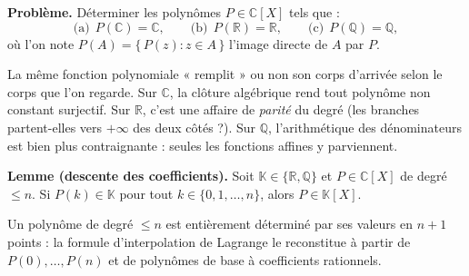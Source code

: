 


\begin{tcolorbox}[thmbox]
  \textbf{Problème.}\enspace%
  Déterminer les polynômes $P \in \mathbb{C}[X]$ tels que :
  \[
    \text{(a)}\ \ P(\mathbb{C}) = \mathbb{C}, \qquad
    \text{(b)}\ \ P(\mathbb{R}) = \mathbb{R}, \qquad
    \text{(c)}\ \ P(\mathbb{Q}) = \mathbb{Q},
  \]
  où l'on note $P(A) = \{\,P(z) : z \in A\,\}$ l'image directe de $A$ par $P$.
\end{tcolorbox}

\begin{significationintuitive}
La même fonction polynomiale « remplit » ou non son corps d'arrivée selon le
corps que l'on regarde. Sur $\mathbb{C}$, la clôture algébrique rend tout
polynôme non constant surjectif. Sur $\mathbb{R}$, c'est une affaire de
\emph{parité} du degré (les branches partent-elles vers $+\infty$ des deux
côtés ?). Sur $\mathbb{Q}$, l'arithmétique des dénominateurs est bien plus
contraignante : seules les fonctions affines y parviennent.
\end{significationintuitive}

\decsep{}


\begin{tcolorbox}[thmbox]
  \textbf{Lemme (descente des coefficients).}\enspace%
  Soit $\mathbb{K} \in \{\mathbb{R}, \mathbb{Q}\}$ et $P \in \mathbb{C}[X]$ de
  degré $\leq n$. Si $P(k) \in \mathbb{K}$ pour tout $k \in \{0,1,\ldots,n\}$,
  alors $P \in \mathbb{K}[X]$.
\end{tcolorbox}

\begin{ideepreuve}
Un polynôme de degré $\leq n$ est entièrement déterminé par ses valeurs en
$n+1$ points : la formule d'interpolation de Lagrange le reconstitue à partir
de $P(0),\ldots,P(n)$ et de polynômes de base à coefficients rationnels.
\end{ideepreuve}

